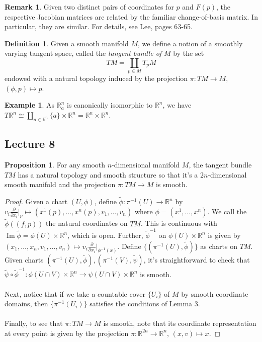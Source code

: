 \documentclass[10pt,letterpaper,cm]{nupset}
\theoremstyle{definition}
\newtheorem*{definition}{Definition}
\newtheorem{exmp}{Example}
\newtheorem{remark}{Remark}
\newtheorem{prop}{Proposition}
\DeclareMathOperator{\Ima}{Im}
\newcommand{\R}{\mathbb R}
\newcommand{\1}{\mathbf{1}}
\newcommand{\0}{\vec 0}
\begin{document}
\begin{remark}
Given two distinct pairs of coordinates for $p$ and $F(p)$, the respective Jacobian matrices are related by the familiar change-of-basis matrix. In particular, they are similar. For details, see Lee, pages 63-65.
\end{remark}

\begin{definition}
Given a smooth manifold $M$, we define a notion of a smoothly varying tangent space, called the \textit{tangent bundle of $M$} by the set  $$TM = \coprod_{p \in M} T_pM$$ endowed with a natural topology induced by the projection $\pi: TM \to M$, $(\phi, p) \mapsto p$.
\end{definition}

\begin{exmp}
As $\R_a^n$ is canonically isomorphic to $\R^n$, we have $T\R^n \cong \coprod_{a\in \R^n} \{a\} \times \R^n = \R^n \times \R^n$.
\end{exmp}

\subsection{Lecture 8}

\begin{prop}
For any smooth $n$-dimensional manifold $M$, the tangent bundle $TM$ has a natural topology and smooth structure so that it's a $2n$-dimensional smooth manifold and the projection $\pi : TM \to M$ is smooth.
\end{prop}
\begin{proof}
Given a chart $(U, \phi)$, define $\tilde{\phi}: \pi^{-1}(U) \to \R^n$ by $v_i\frac{\partial}{\partial{x_i}}\vert_p \mapsto (x^1(p), \ldots, x^n(p), v_1, \ldots, v_n)$ where $\phi = (x^1, \ldots, x^n)$. We call the $\tilde{\phi}((f, p))$ the natural coordinates on $TM$. This is continuous with $\Ima \tilde{\phi} = \phi(U) \times \R^n$, which is open. Further, $\tilde{\phi}^{-1}$ on $\phi(U) \times \R^n$ is given by $(x_1, \ldots, x_n, v_1, \ldots, v_n)\mapsto v_i \frac{\partial}{\partial{x_i}}\vert_{\phi^{-1}(x)}$. Define $\{(\pi^{-1}(U), \tilde{\phi})\}$ as charts on $TM$. Given charts $(\pi^{-1}(U), \tilde{\phi}), (\pi^{-1}(V), \tilde{\psi})$, it's straightforward to check that $\tilde{\psi} \circ \tilde{\phi}^{-1}: \phi(U \cap V)\times \R^n \to \psi(U \cap V)\times \R^n$ is smooth.
\\ \\
Next, notice that if we take a countable cover $\{U_i\}$ of $M$ by smooth coordinate domains, then $\{\pi^{-1}(U_i)\}$ satisfies the conditions of Lemma 3.
\\ \\
Finally, to see that $\pi : TM \to M$ is smooth, note that its coordinate representation at every point is given by the projection $\pi:\R^{2n} \to \R^n$, $(x,v) \mapsto x$.
\end{proof}
\end{document}
